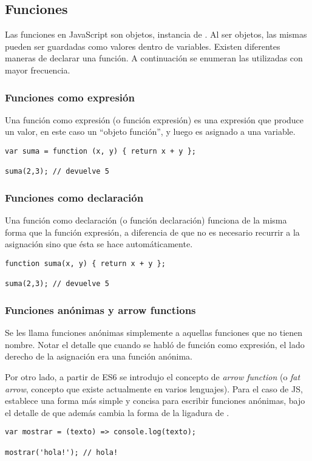 \subsection{Funciones}
\label{sec:funciones}

Las funciones en JavaScript son objetos, instancia de . Al ser objetos, las mismas pueden ser guardadas como valores dentro de variables. Existen diferentes maneras de declarar una función. A continuación se enumeran las utilizadas con mayor frecuencia.

\subsubsection{Funciones como expresión}

Una función como expresión (o función expresión) es una expresión que produce un valor, en este caso un "`objeto función"', y luego es asignado a una variable.

\begin{lstlisting}[title={Función expresión}]
var suma = function (x, y) { return x + y };

suma(2,3); // devuelve 5
\end{lstlisting}

\subsubsection{Funciones como declaración}

Una función como declaración (o función declaración) funciona de la misma forma que la función expresión, a diferencia de que no es necesario recurrir a la asignación sino que ésta se hace automáticamente.

\begin{lstlisting}[title={Función declaración}]
function suma(x, y) { return x + y };

suma(2,3); // devuelve 5
\end{lstlisting}

\subsubsection{Funciones anónimas y arrow functions}

Se les llama funciones anónimas simplemente a aquellas funciones que no tienen nombre. Notar el detalle que cuando se habló de función como expresión, el lado derecho de la asignación era una función anónima.

Por otro lado, a partir de ES6 se introdujo el concepto de \textit{arrow function} (o \textit{fat arrow}, concepto que existe actualmente en varios lenguajes). Para el caso de JS, establece una forma más simple y concisa para escribir funciones anónimas, bajo el detalle de que además cambia la forma de la ligadura de .

\begin{lstlisting}[title={Arrow function}]
var mostrar = (texto) => console.log(texto);

mostrar('hola!'); // hola!
\end{lstlisting}
